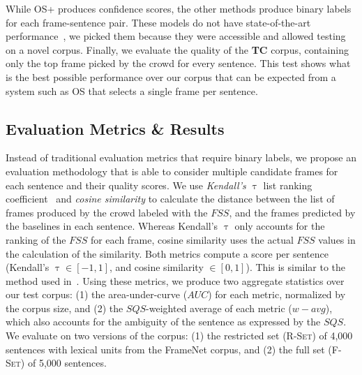 While OS+ produces confidence scores, the other methods produce binary labels for each frame-sentence pair. These models do not have state-of-the-art performance~\cite{hermann2014semantic,fitzgerald2015semantic}, we picked them because they were accessible and allowed testing on a novel corpus. Finally, we evaluate the quality of the \textbf{TC} corpus, containing only the top frame picked by the crowd for every sentence. This test shows what is the best possible performance over our corpus that can be expected from a system such as OS that selects a single frame per sentence. %

\subsection{Evaluation Metrics \& Results}

Instead of traditional evaluation metrics that require binary labels, we propose an evaluation methodology that is able to consider multiple candidate frames for each sentence and their quality scores. We use \textit{Kendall's $\uptau$} list ranking coefficient~\cite{kendall1938new} and \textit{cosine similarity} to calculate the distance between the list of frames produced by the crowd labeled with the $FSS$, and the frames predicted by the baselines in each sentence. Whereas Kendall's $\uptau$ only accounts for the ranking of the $FSS$ for each frame, cosine similarity uses the actual $FSS$ values in the calculation of the similarity. Both metrics compute a score per sentence (Kendall's $\uptau \in [-1,1]$, and cosine similarity $\in [0,1]$). This is similar to the method used in~\cite{dumitrache2015b}.  Using these metrics, we produce two aggregate statistics over our test corpus: (1) the area-under-curve ($AUC$) for each metric, normalized by the corpus size, and (2) the $SQS$-weighted average of each metric ($w-avg$), which also accounts for the ambiguity of the sentence as expressed by the $SQS$. We evaluate on two versions of the corpus: (1) the restricted set (\textsc{R-Set}) of 4,000 sentences with lexical units from the FrameNet corpus, and (2) the full set (\textsc{F-Set}) of 5,000 sentences.

